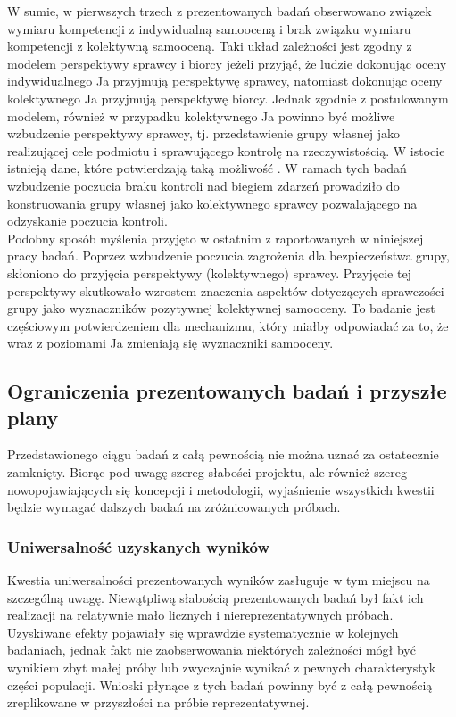 \documentclass[man]{apa6}
\begin{document}
W sumie, w pierwszych trzech z prezentowanych badań obserwowano związek wymiaru kompetencji z indywidualną samooceną i brak związku wymiaru kompetencji z kolektywną samooceną. Taki układ zależności jest zgodny z modelem perspektywy sprawcy i biorcy \parencite{abele2014communal} jeżeli przyjąć, że ludzie dokonując oceny indywidualnego Ja przyjmują perspektywę sprawcy, natomiast dokonując oceny kolektywnego Ja przyjmują perspektywę biorcy. Jednak zgodnie z postulowanym modelem, również w przypadku kolektywnego Ja powinno być możliwe wzbudzenie perspektywy sprawcy, tj. przedstawienie grupy własnej jako realizującej cele podmiotu i sprawującego kontrolę na rzeczywistością. W istocie istnieją dane, które potwierdzają taką możliwość \parencite{fritsche2013power}. W ramach tych badań wzbudzenie poczucia braku kontroli nad biegiem zdarzeń prowadziło do konstruowania grupy własnej jako kolektywnego sprawcy pozwalającego na odzyskanie poczucia kontroli.\\

Podobny sposób myślenia przyjęto w ostatnim z raportowanych w niniejszej pracy badań. Poprzez wzbudzenie poczucia zagrożenia dla bezpieczeństwa grupy, skłoniono do przyjęcia perspektywy (kolektywnego) sprawcy. Przyjęcie tej perspektywy skutkowało wzrostem znaczenia aspektów dotyczących sprawczości grupy jako wyznaczników pozytywnej kolektywnej samooceny. To badanie jest częściowym potwierdzeniem dla mechanizmu, który miałby odpowiadać za to, że wraz z poziomami Ja zmieniają się wyznaczniki samooceny.\\

\subsection{Ograniczenia prezentowanych badań i przyszłe plany}

Przedstawionego ciągu badań z całą pewnością nie można uznać za ostatecznie zamknięty. Biorąc pod uwagę szereg słabości projektu, ale również szereg nowopojawiających się koncepcji i metodologii, wyjaśnienie wszystkich kwestii będzie wymagać dalszych badań na zróżnicowanych próbach. \\

\subsubsection{Uniwersalność uzyskanych wyników}

Kwestia uniwersalności prezentowanych wyników zasługuje w tym miejscu na szczególną uwagę. Niewątpliwą słabością prezentowanych badań był fakt ich realizacji na relatywnie mało licznych i niereprezentatywnych próbach. Uzyskiwane efekty pojawiały się wprawdzie systematycznie w kolejnych badaniach, jednak fakt nie zaobserwowania niektórych zależności mógł być wynikiem zbyt małej próby lub zwyczajnie wynikać z pewnych charakterystyk części populacji. Wnioski płynące z tych badań powinny być z całą pewnością zreplikowane w przyszłości na próbie reprezentatywnej. \\
\end{document}
